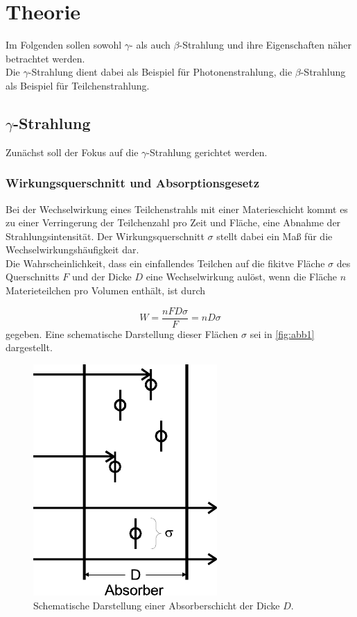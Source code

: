 \section{Theorie}
\label{sec:theorie}

Im Folgenden sollen sowohl $\gamma$- als auch $\beta$-Strahlung und ihre Eigenschaften 
näher betrachtet werden. \\

Die $\gamma$-Strahlung dient dabei als Beispiel für Photonenstrahlung,
die $\beta$-Strahlung als Beispiel für Teilchenstrahlung.

\subsection*{$\gamma$-Strahlung}

Zunächst soll der Fokus auf die $\gamma$-Strahlung gerichtet werden.

\subsubsection*{Wirkungsquerschnitt und Absorptionsgesetz}

Bei der Wechselwirkung eines Teilchenstrahls mit einer Materieschicht
kommt es zu einer Verringerung der Teilchenzahl pro Zeit und Fläche, 
eine Abnahme der Strahlungsintensität.
Der Wirkungsquerschnitt $\sigma$ stellt dabei ein Maß für die 
Wechselwirkungshäufigkeit dar. \\

Die Wahrscheinlichkeit, dass ein einfallendes Teilchen auf
die fikitve Fläche $\sigma$ des Querschnitts $F$ und der Dicke $D$
eine Wechselwirkung aulöst, wenn die Fläche $n$ Materieteilchen pro
Volumen enthält, ist durch

\begin{equation}
    W = \frac{n F D \sigma}{F} = n D \sigma
\end{equation}
gegeben.
Eine schematische Darstellung dieser Flächen $\sigma$ sei in
\autoref{fig:abb1} dargestellt.

\begin{figure}
    \centering
    \includegraphics{figures/abb1.pdf}
    \caption{Schematische Darstellung einer Absorberschicht der Dicke $D$\cite{ap04}.}
    \label{fig:abb1}
\end{figure}

